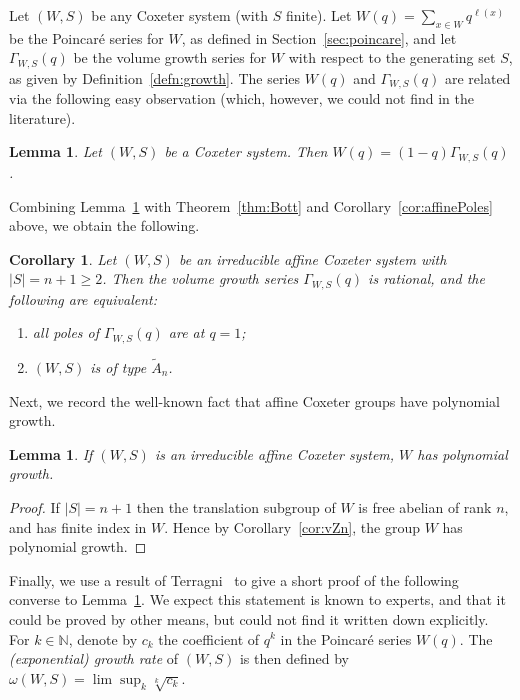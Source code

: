 \documentclass[11pt]{amsart}
\theoremstyle{plain}
\newtheorem{lemma}[thm]{Lemma}
\newtheorem{corollary}[thm]{Corollary}
\theoremstyle{definition}
\newcommand{\N}{\mathbb{N}}
\newcommand{\G}{\Gamma} %
\numberwithin{equation}{subsection}
\begin{document}
Let $(W,S)$ be any Coxeter system (with $S$ finite). Let $W(q) = \sum_{x \in W} q^{\ell(x)} $ be the Poincar\'e series for $W$, as defined in Section~\ref{sec:poincare},  and let $\G_{W,S}(q)$ be the volume growth series for $W$ with respect to the generating set $S$, as given by Definition~\ref{defn:growth}. 
The series $W(q)$ and $\G_{W,S}(q)$ are related via the following easy observation (which, however, we could not find in the literature).

\begin{lemma}\label{lem:PoincareGrowth} 
Let $(W,S)$ be a Coxeter system. Then $
W(q) = (1 - q) \G_{W,S}(q)$.
\end{lemma}

Combining Lemma~\ref{lem:PoincareGrowth} with Theorem~\ref{thm:Bott} and Corollary~\ref{cor:affinePoles} above, we obtain the following.

\begin{corollary}\label{cor:affineGrowth} 
Let $(W,S)$ be an irreducible affine Coxeter system with $|S| = n+1 \geq 2$. Then the volume growth series $\G_{W,S}(q)$ is rational, and the following are equivalent:
\begin{enumerate}
\item all poles of $\G_{W,S}(q)$ are at $q = 1$;
\item $(W,S)$ is of type $\tilde{A}_n$.
\end{enumerate}
\end{corollary}


Next, we record the well-known fact that affine Coxeter groups have polynomial growth.

\begin{lemma}\label{lem:affinePoly} If $(W,S)$ is an irreducible affine Coxeter system, $W$ has polynomial growth.
\end{lemma}
\begin{proof} If $|S| = n+1$ then the translation subgroup of $W$ is free abelian of rank $n$, and has finite index in $W$. Hence by Corollary~\ref{cor:vZn}, the group $W$ has polynomial growth.
\end{proof}

Finally, we use a result of Terragni~\cite{Terragni} to give a short proof of the following converse to Lemma~\ref{lem:affinePoly}. We expect this statement is known to experts, and that it could be proved by other means, but could not find it written down explicitly. For $k \in \N$, denote by $c_k$ the coefficient of $q^k$ in the Poincar\'e series $W(q)$. The \emph{(exponential) growth rate} of $(W,S)$ is then defined by $\omega(W,S) = \lim \sup_k \sqrt[k]{c_k}$. 
\end{document}
